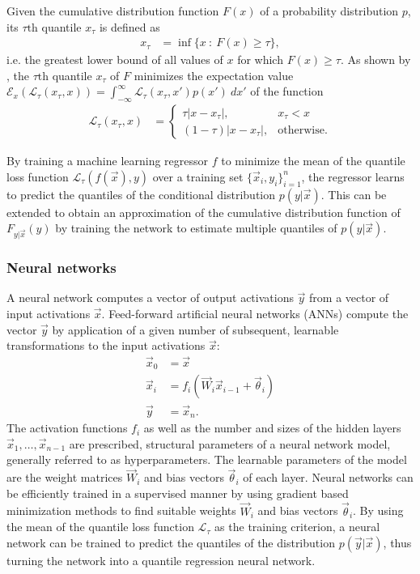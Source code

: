 \documentclass[journal abbreviation, manuscript]{copernicus}
\begin{document}
Given the cumulative distribution function $F(x)$ of a probability distribution
$p$, its $\tau\text{th}$ quantile $x_\tau$ is defined as
\begin{align}
x_\tau &= \inf \{x \: : \: F(x) \geq \tau \},
\end{align}
i.e. the greatest lower bound of all values of $x$ for which $F(x) \geq \tau$.
As shown by \citet{koenker}, the $\tau\text{th}$ quantile $x_\tau$ of $F$
minimizes the expectation value $\mathcal{E}_x\left ( \mathcal{L}_\tau(x_\tau, x) \right) = \int_{-\infty}^\infty \mathcal{L}_\tau(x_\tau, x') p(x') \: dx'$
of the function
\begin{align}\label{eq:quantile_loss}
  \mathcal{L}_{\tau}(x_\tau, x) &=
  \begin{cases}
    \tau |x - x_\tau|, & x_\tau < x \\
    (1 - \tau)|x - x_\tau|, &\text{otherwise}.
    \end{cases}
\end{align}

By training a machine learning regressor $f$ to minimize the mean of the quantile loss
function $\mathcal{L}_\tau(f(\vec{x}), y)$ over a training set $\{\vec{x}_i,
y_i\}_{i = 1}^n$, the regressor learns to predict the quantiles of the
conditional distribution $p(y | \vec{x})$. This can be extended to obtain an
approximation of the cumulative distribution function of $F_{y | \vec{x}}(y)$ by
training the network to estimate multiple quantiles of $p(y | \vec{x})$.

\subsubsection{Neural networks}

A neural network computes a vector of output activations $\vec{y}$ from a vector
of input activations $\vec{x}$. Feed-forward artificial neural networks (ANNs)
compute the vector $\vec{y}$ by application of a given number of subsequent,
learnable transformations to the input activations $\vec{x}$:
\begin{align*}
    \vec{x}_0 &= \vec{x}\\
    \vec{x}_i &= f_{i}
    \left ( \vec{W}_{i} \vec{x}_{i - 1}+ \vec{\theta}_i \right ) \\
    \vec{y} &= \vec{x}_{n}.
\end{align*}
The activation functions $f_i$ as well as the number and sizes of the hidden
layers $\vec{x}_1, \ldots, \vec{x}_{n-1}$ are prescribed, structural parameters of a
neural network model, generally referred to as hyperparameters. The learnable
parameters of the model are the weight matrices $\vec{W}_i$ and bias vectors
$\vec{\theta}_i$ of each layer. Neural networks can be efficiently trained in
a supervised manner by using gradient based minimization methods to find
suitable weights $\vec{W}_i$ and bias vectors $\vec{\theta}_i$. By using the
mean of the quantile loss function $\mathcal{L}_\tau$ as the training criterion,
a neural network can be trained to predict the quantiles of the distribution
$p(\vec{y} | \vec{x})$, thus turning the network into a quantile regression
neural network.
\end{document}
